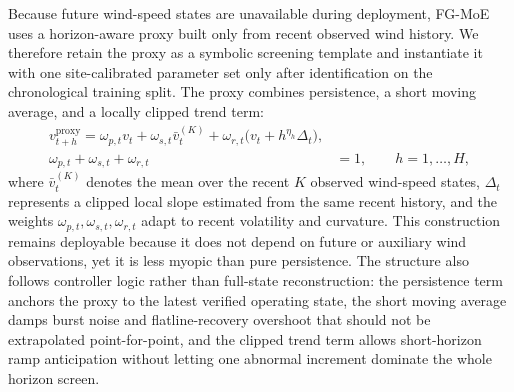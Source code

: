 \documentclass[review,1p,times]{elsarticle}
\begin{document}
Because future wind-speed states are unavailable during deployment, FG-MoE uses a horizon-aware proxy built only from recent observed wind history. We therefore retain the proxy as a symbolic screening template and instantiate it with one site-calibrated parameter set only after identification on the chronological training split. The proxy combines persistence, a short moving average, and a locally clipped trend term:
\begin{equation}
\begin{aligned}
v_{t+h}^{\mathrm{proxy}}
=\omega_{p,t}v_t+\omega_{s,t}\bar{v}^{(K)}_t+\omega_{r,t}\big(v_t+h^{\eta_h}\Delta_t\big),\\
\omega_{p,t}+\omega_{s,t}+\omega_{r,t}&=1,\qquad h=1,\ldots,H,
\end{aligned}
\label{eq:fg_proxy_last}
\end{equation}
where $\bar{v}^{(K)}_t$ denotes the mean over the recent $K$ observed wind-speed states, $\Delta_t$ represents a clipped local slope estimated from the same recent history, and the weights $\omega_{p,t},\omega_{s,t},\omega_{r,t}$ adapt to recent volatility and curvature. This construction remains deployable because it does not depend on future or auxiliary wind observations, yet it is less myopic than pure persistence. The structure also follows controller logic rather than full-state reconstruction: the persistence term anchors the proxy to the latest verified operating state, the short moving average damps burst noise and flatline-recovery overshoot that should not be extrapolated point-for-point, and the clipped trend term allows short-horizon ramp anticipation without letting one abnormal increment dominate the whole horizon screen.
\end{document}
